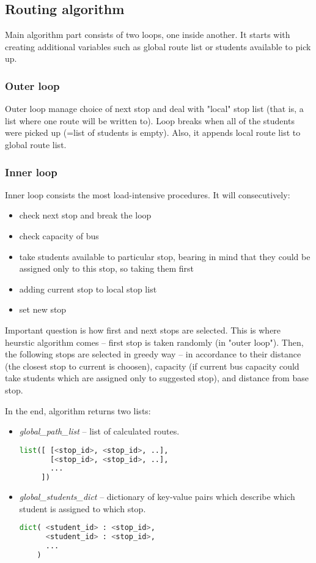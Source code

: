 \documentclass [a4paper, 12pt]{article}
\begin{document}
\subsection{Routing algorithm}
Main algorithm part consists of two loops, one inside another.
It starts with creating additional variables such as global route list or students available to pick up.
\subsubsection{Outer loop}
Outer loop manage choice of next stop and deal with "local" stop list (that is, a list where one route will be written to). Loop breaks when all of the students were picked up (=list of students is empty). Also, it appends local route list to global route list.
\subsubsection{Inner loop}
Inner loop consists the most load-intensive procedures. It will consecutively:
\begin{itemize}
    \item check next stop and break the loop
    \item check capacity of bus
    \item take students available to particular stop, bearing in mind that they could be assigned only to this stop, so taking them first
    \item adding current stop to local stop list
    \item set new stop
\end{itemize}

Important question is how first and next stops are selected. This is where heurstic algorithm comes -- first stop is taken randomly (in "outer loop"). Then, the following stops are selected in greedy way -- in accordance to their distance (the closest stop to current is choosen), capacity (if current bus capacity could take students which are assigned only to suggested stop), and distance from base stop.

In the end, algorithm returns two lists:
\begin{itemize}
    \item \textit{global_path_list} -- list of calculated routes.
        \begin{lstlisting}[basicstyle=\scriptsize,language=Python]
list([ [<stop_id>, <stop_id>, ..],
       [<stop_id>, <stop_id>, ..],
       ...
     ])\end{lstlisting}
    \item \textit{global_students_dict} -- dictionary of key-value pairs which describe which student is assigned to which stop.
        \begin{lstlisting}[basicstyle=\scriptsize,language=Python]
dict( <student_id> : <stop_id>,
      <student_id> : <stop_id>,
      ...
    )\end{lstlisting}
\end{itemize}
\end{document}
